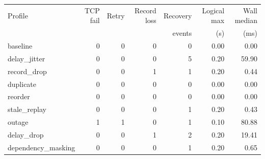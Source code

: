 \begin{tabular}{@{}lrrrrrr@{}}
\toprule
Profile & TCP fail & Retry & Record loss & Recovery & Logical max & Wall median \\
 & & & & events & (s) & (ms) \\
\midrule
baseline & 0 & 0 & 0 & 0 & 0.00 & 0.00 \\
delay\_jitter & 0 & 0 & 0 & 5 & 0.20 & 59.90 \\
record\_drop & 0 & 0 & 1 & 1 & 0.20 & 0.44 \\
duplicate & 0 & 0 & 0 & 0 & 0.00 & 0.00 \\
reorder & 0 & 0 & 0 & 0 & 0.00 & 0.00 \\
stale\_replay & 0 & 0 & 0 & 1 & 0.20 & 0.43 \\
outage & 1 & 1 & 0 & 1 & 0.10 & 80.88 \\
delay\_drop & 0 & 0 & 1 & 2 & 0.20 & 19.41 \\
dependency\_masking & 0 & 0 & 0 & 1 & 0.20 & 0.65 \\
\bottomrule
\end{tabular}
